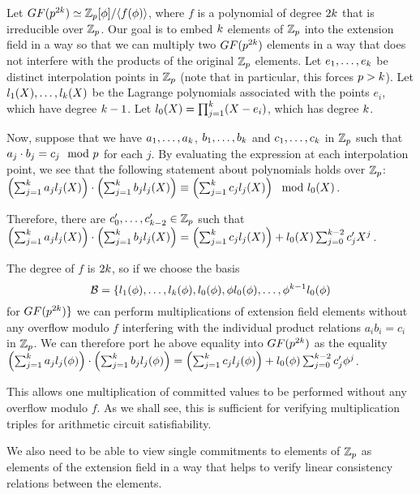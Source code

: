 Let $GF(p^{2k}) \simeq \mathbb{Z}_p[\phi]/\langle f(\phi) \rangle$, where $f$ is a polynomial of degree $2k$ that is irreducible over $\mathbb{Z}_p$. Our goal is to embed $k$ elements of $\mathbb{Z}_p$ into the extension field in a way so that we can multiply two $GF(p^{2k})$ elements in a way that does not interfere with the products of the original $\mathbb{Z}_p$ elements. Let $e_1,\ldots,e_k$ be distinct interpolation points in $\mathbb{Z}_p$ (note that in particular, this forces $p>k$). Let $l_1(X),\ldots,l_k(X)$ be the Lagrange polynomials associated with the points $e_i$, which have degree $k-1$. Let $l_0(X) = \prod_{j=1}^k (X-e_i)$, which has degree $k$.

Now, suppose that we have $a_1,\ldots,a_k$, $b_1,\ldots,b_k$ and $c_1,\ldots,c_k$ in $\mathbb{Z}_p$ such that $a_j \cdot b_j = c_j \mod {p}$ for each $j$. By evaluating the expression at each interpolation point, we see that the following statement about polynomials holds over $\mathbb{Z}_p$: $ \left( \sum_{j=1}^k a_j l_j(X) \right) \cdot \left( \sum_{j=1}^k b_j l_j(X) \right) \equiv \left( \sum_{j=1}^k c_j l_j(X) \right) \mod l_0(X)$.

Therefore, there are $c'_0,\ldots,c'_{k-2}\in \mathbb{Z}_p$ such that $\left( \sum_{j=1}^k a_j l_j(X) \right) \cdot \left( \sum_{j=1}^k b_j l_j(X) \right) = \left( \sum_{j=1}^k c_j l_j(X) \right) + l_0(X) \sum_{j=0}^{k-2} c'_j X^j$.

The degree of $f$ is $2k$, so if we choose the basis
\[\mathcal{B} = \{ l_1(\phi),\ldots,l_k(\phi),l_0(\phi),\phi l_0(\phi),\ldots,\phi^{k-1} l_0(\phi)\]
for $GF(p^{2k}) \}$ we can perform multiplications of extension field elements without any overflow modulo $f$ interfering with the individual product relations $a_i b_i = c_i$ in $\mathbb{Z}_p$. We can therefore port he above equality into $GF(p^{2k})$ as the equality $\left( \sum_{j=1}^k a_j l_j(\phi) \right) \cdot \left( \sum_{j=1}^k b_j l_j(\phi) \right) = \left( \sum_{j=1}^k c_j l_j(\phi) \right) + l_0(\phi) \sum_{j=0}^{k-2} c'_j \phi^j$.

This allows one multiplication of committed values to be performed without any overflow modulo $f$. As we shall see, this is sufficient for verifying multiplication triples for arithmetic circuit satisfiability.

We also need to be able to view single commitments to elements of $\mathbb{Z}_p$ as elements of the extension field in a way that helps to verify linear consistency relations between the elements.

